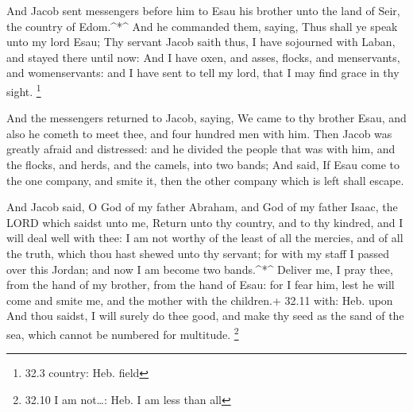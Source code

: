  And Jacob sent messengers before him to Esau his brother
unto the land of Seir, the country of Edom.\^{}*\^{}  And he
commanded them, saying, Thus shall ye speak unto my lord Esau; Thy
servant Jacob saith thus, I have sojourned with Laban, and stayed there
until now:  And I have oxen, and asses, flocks, and
menservants, and womenservants: and I have sent to tell my lord, that I
may find grace in thy sight. \footnote{32.3 country: Heb. field}

 And the messengers returned to Jacob, saying, We came to
thy brother Esau, and also he cometh to meet thee, and four hundred men
with him.  Then Jacob was greatly afraid and distressed: and
he divided the people that was with him, and the flocks, and herds, and
the camels, into two bands;  And said, If Esau come to the
one company, and smite it, then the other company which is left shall
escape.

 And Jacob said, O God of my father Abraham, and God of my
father Isaac, the LORD which saidst unto me, Return unto thy country,
and to thy kindred, and I will deal well with thee:  I am
not worthy of the least of all the mercies, and of all the truth, which
thou hast shewed unto thy servant; for with my staff I passed over this
Jordan; and now I am become two bands.\^{}*\^{}  Deliver
me, I pray thee, from the hand of my brother, from the hand of Esau: for
I fear him, lest he will come and smite me, and the mother with the
children.+ 32.11 with: Heb. upon  And thou saidst, I will
surely do thee good, and make thy seed as the sand of the sea, which
cannot be numbered for multitude. \footnote{32.10 I am not\ldots: Heb. I
  am less than all}

